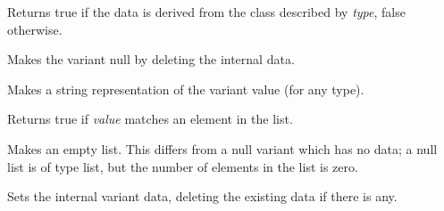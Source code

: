 Returns true if the data is derived from the class described by {\it type}, false otherwise.

\label{wxvariantmakenull}


Makes the variant null by deleting the internal data.

\label{wxvariantmakestring}


Makes a string representation of the variant value (for any type).

\label{wxvariantmember}


Returns true if {\it value} matches an element in the list.

\label{wxvariantnulllist}


Makes an empty list. This differs from a null variant which has no data; a null list
is of type list, but the number of elements in the list is zero.

\label{wxvariantsetdata}


Sets the internal variant data, deleting the existing data if there is any.

\label{wxvariantassignment}











